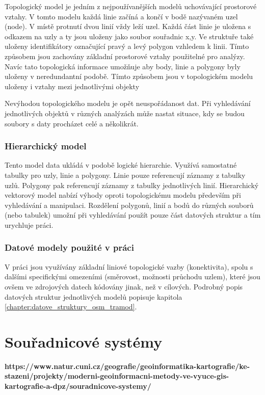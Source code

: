 Topologický model je jedním z nejpoužívanějších modelů uchovávající prostorové vztahy. V tomto modelu každá linie začíná a končí v bodě nazývaném uzel (node). V místě protnutí dvou linií vždy leží uzel. Každá část linie je uložena s odkazem na uzly a ty jsou uloženy jako soubor souřadnic x,y. Ve struktuře také uloženy identifikátory označující pravý a levý polygon vzhledem k linii. Tímto způsobem jsou zachovány základní prostorové vztahy použitelné pro analýzy. Navíc tato topologická informace umožňuje aby body, linie a polygony byly uloženy v neredundantní podobě. Tímto způsobem jsou v topologickém modelu uloženy i vztahy mezi jednotlivými objekty

Nevýhodou topologického modelu je opět neuspořádanost dat. Při vyhledávání jednotlivých objektů v různých analýzách může nastat situace, kdy se budou soubory s daty procházet celé a několikrát. 

\subsubsection{Hierarchický model}
\label{subsubsection:hiearchicky_model}

Tento model data ukládá v podobě logické hierarchie. Využívá samostatné tabulky pro uzly, linie a polygony. Linie pouze referencují záznamy z tabulky uzlů. Polygony pak referencují záznamy z tabulky jednotlivých linií. Hierarchický vektorový model nabízí výhody oproti topologickému modelu především při vyhledávání a manipulaci. Rozdělení polygonů, linií a bodů do různých souborů (nebo tabulek) umožní při vyhledávání použít pouze část datových struktur a tím urychluje práci.

\subsubsection{Datové modely použité v práci}
V práci jsou využívány základní liniové topologické vazby (konektivita), spolu s dalšími specifickými omezeními (směrovost, možnosti průchodu uzlem), které jsou ovšem ve zdrojových datech kódovány jinak, než v cílových. Podrobný popis datových struktur jednotlivých modelů popisuje kapitola \ref{chapter:datove_struktury_osm_tramod}.


\section{Souřadnicové systémy}
\label{section:souradnicove_systemy}

\textbf{https://www.natur.cuni.cz/geografie/geoinformatika-kartografie/ke-stazeni/projekty/moderni-geoinformacni-metody-ve-vyuce-gis-kartografie-a-dpz/souradnicove-systemy/}

